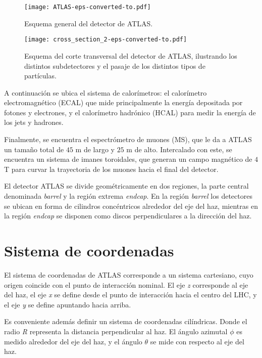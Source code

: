 \begin{figure}
\centering
\texttt{[image: ATLAS-eps-converted-to.pdf]}
\caption{Esquema general del detector de ATLAS.}
\label{ATLAS}
\end{figure}

\begin{figure}
\centering
\texttt{[image: cross\_section\_2-eps-converted-to.pdf]}
\caption{Esquema del corte transversal del detector de ATLAS, ilustrando los distintos subdetectores y el pasaje de los distintos tipos de partículas.}
\label{cross_section_2}
\end{figure}

A continuación se ubica el sistema de calorímetros: el calorímetro electromagnético (ECAL) que mide principalmente la energía depositada por fotones y electrones, y el calorímetro hadrónico (HCAL) para medir la energía de los jets y hadrones.

Finalmente, se encuentra el espectrómetro de muones (MS), que le da a ATLAS un tamaño total de $45$ m de largo y $25$ m de alto. Intercalado con este, se encuentra un sistema de imanes toroidales, que generan un campo magnético de $4$ T para curvar la trayectoria de los muones hacia el final del detector.

El detector ATLAS se divide geométricamente en dos regiones, la parte central denominada \textit{barrel} y la región extrema \textit{endcap}. En la región \textit{barrel} los detectores se ubican en forma de cilindros concéntricos alrededor del eje del haz, mientras en la región \textit{endcap} se disponen como discos perpendiculares a la dirección del haz. 

\section{Sistema de coordenadas}

El sistema de coordenadas de ATLAS corresponde a un sistema cartesiano, cuyo origen coincide con el punto de interacción nominal. El eje \textit{z} corresponde al eje del haz, el eje \textit{x} se define desde el punto de interacción hacia el centro del LHC, y el eje \textit{y} se define apuntando hacia arriba.

Es conveniente además definir un sistema de coordenadas cilíndricas. Donde el radio \textit{R} representa la distancia perpendicular al haz. El ángulo azimutal $\phi$ es medido alrededor del eje del haz, y el ángulo $\theta$ se mide con respecto al eje del haz. 

